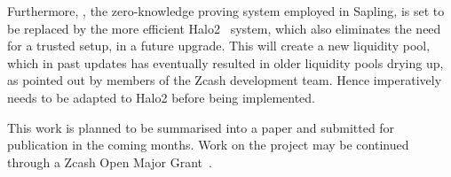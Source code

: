 Furthermore, \groth, the zero-knowledge proving system employed in Sapling, is set to be replaced by the more efficient Halo2~\cite{ECCreleasescodeforHalo2} system, which also eliminates the need for a trusted setup, in a future upgrade.
This will create a new liquidity pool, which in past updates has eventually resulted in older liquidity pools drying up, as pointed out by members of the Zcash development team.
Hence \zclaim imperatively needs to be adapted to Halo2 before being implemented.

This work is planned to be summarised into a paper and submitted for publication in the coming months.
Work on the project may be continued through a Zcash Open Major Grant~\cite{AboutusZcashOpenMajorGrantsZOMG}.